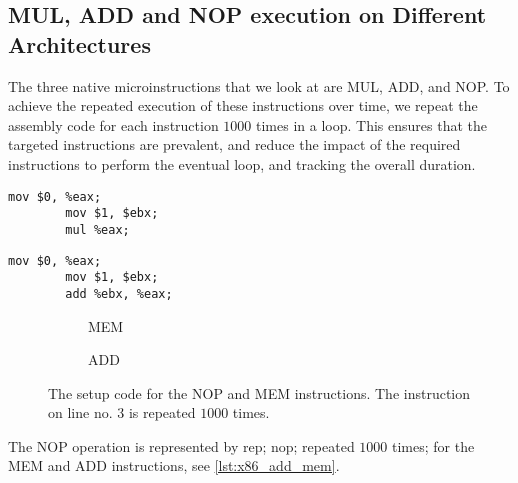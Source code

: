\subsection{MUL, ADD and NOP execution on Different Architectures}\label{chp4:subsec:MUL_ADD_NOP_instructions}
The three native microinstructions that we look at are MUL, ADD, and NOP.
To achieve the repeated execution of these instructions over time, we repeat the assembly code for each instruction \(1000\) times in a loop.
This ensures that the targeted instructions are prevalent, and reduce the impact of the required instructions to perform the eventual loop, and tracking the overall duration.

\newsavebox{\MEMfigure}
	\begin{lrbox}{\MEMfigure}%
	\begin{lstlisting}[language={[x86masm]Assembler}]
		mov $0, %eax;
		mov $1, $ebx;
		mul %eax;
	\end{lstlisting}
\end{lrbox}

\newsavebox{\ADDfigure}
	\begin{lrbox}{\ADDfigure}%
	\begin{lstlisting}[language={[x86masm]Assembler}]
		mov $0, %eax;
		mov $1, $ebx;
		add %ebx, %eax;
	\end{lstlisting}
\end{lrbox}

\begin{figure}[h]
    \begin{subfigure}{0.5\textwidth}
        \centering
        \usebox{\MEMfigure}
        \caption{MEM}
    \end{subfigure}
    \begin{subfigure}{0.5\textwidth}
        \centering
        \usebox{\ADDfigure}
        \caption{ADD}
    \end{subfigure}
	\caption{The setup code for the NOP and MEM instructions. The instruction on line no. 3 is repeated \(1000\) times.}
	\label{lst:x86_add_mem}
\end{figure}

The NOP operation is represented by rep; nop; repeated \(1000\) times; for the MEM and ADD instructions, see \autoref{lst:x86_add_mem}.


